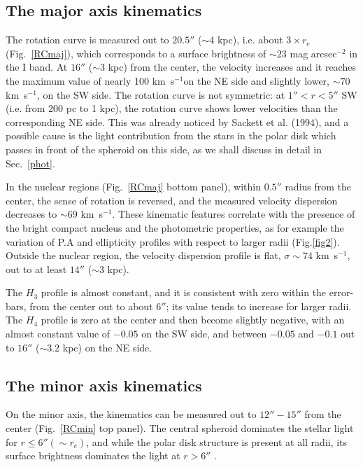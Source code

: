 \documentclass[12pt,preprint]{aastex}
\newcommand{\kms}{\mbox{km~s$^{-1}$}}
\begin{document}
\subsection{The major axis kinematics}\label{maj}

The rotation curve is measured out to $20.5''$ ($\sim 4$ kpc),
i.e. about $ 3 \times r_e$ (Fig.~\ref{RCmaj}), which corresponds to a
surface brightness of $\sim 23$ mag arcsec$^{-2}$ in the I band. At
$16''$ ($\sim 3$ kpc) from the center, the velocity increases and it
reaches the maximum value of nearly 100 \kms on the NE side and
slightly lower, $\sim 70$ \kms, on the SW side. The rotation curve is
not symmetric: at $1''< r <5''$ SW (i.e. from 200 pc to 1 kpc), the
rotation curve shows lower velocities than the corresponding NE
side. This was already noticed by Sackett et al. (1994), and a
possible cause is the light contribution from the stars in the polar
disk which passes in front of the spheroid on this side, as we shall
discuss in detail in Sec.~\ref{phot}.

In the nuclear regions (Fig.~\ref{RCmaj} bottom panel), within $0.5''$
radius from the center, the sense of rotation is reversed, and the
measured velocity dispersion decreases to $ \sim 69$ \kms. These
kinematic features correlate with the presence of the bright compact
nucleus and the photometric properties, as for example the variation
of P.A and ellipticity profiles with respect to larger radii
(Fig.\ref{fig2}). Outside the nuclear region, the velocity dispersion
profile is flat, $\sigma \sim 74$ \kms, out to at least $14''$ ($\sim
3$ kpc).

The $H_3$ profile is almost constant, and it is consistent with zero
within the error-bars, from the center out to about $6''$; its value
tends to increase for larger radii. The $H_4$ profile is zero at the
center and then become slightly negative, with an almost constant
value of $-0.05$ on the SW side, and between $-0.05$ and $-0.1$ out to
$16''$ ($\sim 3.2$ kpc) on the NE side. 

\subsection{The minor axis kinematics}\label{min}

On the minor axis, the kinematics can be measured out to $12'' - 15''$
from the center (Fig.~\ref{RCmin} top panel). The central spheroid
dominates the stellar light for $r \le 6'' (\sim r_e)$, and while the
polar disk structure is present at all radii, its surface brightness
dominates the light at $r> 6''$ .
\end{document}
